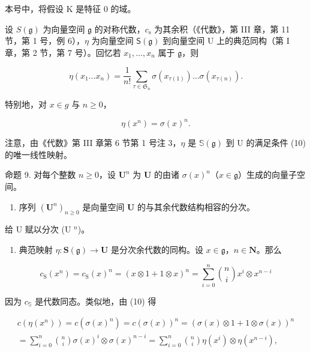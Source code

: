 本号中，将假设 K 是特征 0 的域。

设 \(S(\mathfrak{g})\) 为向量空间 \(\mathfrak{g}\) 的对称代数，\(c_{\mathrm{s}}\) 为其余积（《代数》，第 III 章，第 11 节，第 1 号，例 6），\(\eta\) 为向量空间 \(\mathsf{S}(\mathfrak{g})\) 到向量空间 U 上的典范同构（第 I 章，第 2 节，第 7 号）。回忆若 \(x_{1},\ldots ,x_{n}\) 属于 \(\mathfrak{g}\)，则

\[
\eta (x _ {1} \dots x _ {n}) = \frac {1}{n !} \sum_ {\tau \in \mathfrak {S} _ {n}} \sigma (x _ {\tau (1)}) \dots \sigma (x _ {\tau (n)}).\tag{9}
\]

特别地，对 \(x \in g\) 与 \(n \geqslant 0\)，

\[
\eta (x ^ {n}) = \sigma (x) ^ {n}.\tag{10}
\]

注意，由《代数》第 III 章第 6 节第 1 号注 3，\(\eta\) 是 \(\mathbb{S}(\mathfrak{g})\) 到 U 的满足条件 (10) 的唯一线性映射。

命题 9. 对每个整数 \(n \geqslant 0\)，设 \(\mathbf{U}^n\) 为 \(\mathbf{U}\) 的由诸 \(\sigma(x)^n\)（\(x \in \mathfrak{g}\)）生成的向量子空间。

\begin{enumerate}
\def\labelenumi{(\alph{enumi})}
\tightlist
\item
  序列 \((\mathbf{U}^n)_{n\geqslant 0}\) 是向量空间 \(\mathbf{U}\) 的与其余代数结构相容的分次。
\end{enumerate}

给 U 赋以分次 (U \(^{n}\))。

\begin{enumerate}
\def\labelenumi{(\alph{enumi})}
\setcounter{enumi}{1}
\tightlist
\item
  典范映射 \(\eta: \mathbf{S}(\mathfrak{g}) \to \mathbf{U}\) 是分次余代数的同构。设 \(x \in \mathfrak{g}\)，\(n \in \mathbf{N}\)。那么
\end{enumerate}

\[
c _ {\mathrm{S}} (x ^ {n}) = c _ {\mathrm{S}} (x) ^ {n} = (x \otimes 1 + 1 \otimes x) ^ {n} = \sum_ {i = 0} ^ {n} {\binom {n} {i}} x ^ {i} \otimes x ^ {n - i}\tag{11}
\]

因为 \(c_{\mathbb{S}}\) 是代数同态。类似地，由 (10) 得

\[
\begin{array}{l} c (\eta (x ^ {n})) = c (\sigma (x) ^ {n}) = c (\sigma (x)) ^ {n} = (\sigma (x) \otimes 1 + 1 \otimes \sigma (x)) ^ {n} \\ = \sum_ {i = 0} ^ {n} \binom {n} {i} \sigma (x) ^ {i} \otimes \sigma (x) ^ {n - i} = \sum_ {i = 0} ^ {n} \binom {n} {i} \eta (x ^ {i}) \otimes \eta (x ^ {n - i}), \end{array}\tag{12}
\]

